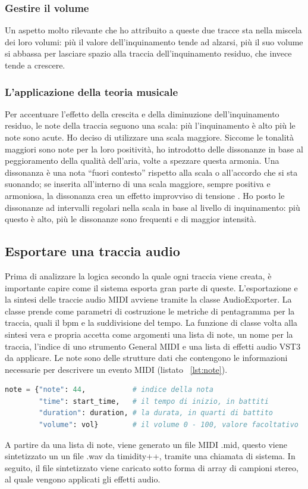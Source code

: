 \subsubsection{Gestire il volume}
Un aspetto molto rilevante che ho attribuito a queste due tracce sta nella miscela dei loro volumi: più il valore dell'inquinamento tende ad alzarsi, più il suo volume si abbassa per lasciare spazio alla traccia dell'inquinamento residuo, che invece tende a crescere.
\subsubsection{L'applicazione della teoria musicale}
Per accentuare l'effetto della crescita e della diminuzione dell'inquinamento residuo, le note della traccia seguono una scala: più l'inquinamento è alto più le note sono acute.
Ho deciso di utilizzare una scala maggiore. Siccome le tonalità maggiori sono note per la loro positività, ho introdotto delle dissonanze in base al peggioramento della qualità dell'aria, volte a spezzare questa armonia.
Una dissonanza è una nota “fuori contesto” rispetto alla scala o all'accordo che si sta suonando; se inserita all'interno di una scala maggiore, sempre positiva e armoniosa, la dissonanza crea un effetto improvviso di tensione \cite{dissonance}.
Ho posto le dissonanze ad intervalli regolari nella scala in base al livello di inquinamento: più questo è alto, più le dissonanze sono frequenti e di maggior intensità.




\subsection{Esportare una traccia audio}
Prima di analizzare la logica secondo la quale ogni traccia viene creata, è importante capire come il sistema esporta gran parte di queste.
L'esportazione e la sintesi delle traccie audio MIDI avviene tramite la classe AudioExporter.
La classe prende come parametri di costruzione le metriche di pentagramma per la traccia, quali il bpm e la suddivisione del tempo.
La funzione di classe volta alla sintesi vera e propria accetta come argomenti una lista di note, un nome per la traccia, l'indice di uno strumento General MIDI e una lista di effetti audio VST3 da applicare.
Le note sono delle strutture dati che contengono le informazioni necessarie per descrivere un evento MIDI (listato ~\ref{lst:note}).

\begin{lstlisting}[language=Python,caption={Composizione di una nota.},label={lst:note}]
note = {"note": 44,           # indice della nota
        "time": start_time,   # il tempo di inizio, in battiti 
        "duration": duration, # la durata, in quarti di battito
        "volume": vol}        # il volume 0 - 100, valore facoltativo
\end{lstlisting}
A partire da una lista di note, viene generato un file MIDI .mid, questo viene sintetizzato un un file .wav da timidity++, tramite una chiamata di sistema.
In seguito, il file sintetizzato viene caricato sotto forma di array di campioni stereo, al quale vengono applicati gli effetti audio.




